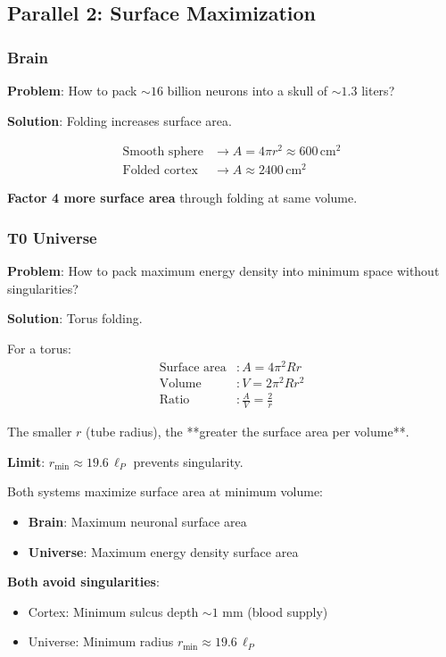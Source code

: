 	\subsection{Parallel 2: Surface Maximization}

	\subsubsection{Brain}

	\textbf{Problem}: How to pack $\sim 16$ billion neurons into a skull of $\sim 1.3$ liters?

	\textbf{Solution}: Folding increases surface area.

	\begin{align}
		\text{Smooth sphere} &\to A = 4\pi r^2 \approx 600\,\text{cm}^2 \\
		\text{Folded cortex} &\to A \approx 2400\,\text{cm}^2
	\end{align}

	\textbf{Factor 4 more surface area} through folding at same volume.

	\subsubsection{T0 Universe}

	\textbf{Problem}: How to pack maximum energy density into minimum space without singularities?

	\textbf{Solution}: Torus folding.

	For a torus:
	\begin{align}
		\text{Surface area} &: A = 4\pi^2 R r \\
		\text{Volume} &: V = 2\pi^2 R r^2 \\
		\text{Ratio} &: \frac{A}{V} = \frac{2}{r}
	\end{align}

	The smaller $r$ (tube radius), the **greater the surface area per volume**.

	\textbf{Limit}: $r_{\min} \approx 19.6\, \ell_P$ prevents singularity.

	\begin{keyresult}
		Both systems maximize surface area at minimum volume:

		\begin{itemize}
			\item \textbf{Brain}: Maximum neuronal surface area
			\item \textbf{Universe}: Maximum energy density surface area
		\end{itemize}

		\textbf{Both avoid singularities}:
		\begin{itemize}
			\item Cortex: Minimum sulcus depth $\sim 1$ mm (blood supply)
			\item Universe: Minimum radius $r_{\min} \approx 19.6\, \ell_P$
		\end{itemize}
	\end{keyresult}

